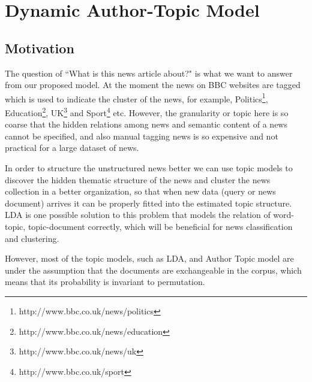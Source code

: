 \chapter{Dynamic Author-Topic Model}
\label{chapterlabel3}

\section{Motivation}

The question of ``What is this news article about?" is what we want to answer from our proposed model. At the moment the news on BBC websites are tagged which is used to indicate the cluster of the news, for example, Politics\footnote{http://www.bbc.co.uk/news/politics}, Education\footnote{http://www.bbc.co.uk/news/education}, UK\footnote{http://www.bbc.co.uk/news/uk} and Sport\footnote{http://www.bbc.co.uk/sport} etc. However, the granularity or topic here is so coarse that the hidden relations among news and semantic content of a news cannot be specified, and also manual tagging news is so expensive and not practical for a large dataset of news. 

In order to structure the unstructured news better we can use topic models to discover the hidden thematic structure of the news and cluster the news collection in a better organization, so that when new data (query or news document) arrives it can be properly fitted into the estimated topic structure. LDA is one possible solution to this problem that models the relation of word-topic, topic-document correctly, which will be beneficial for news classification and clustering. 

However, most of the topic models, such as LDA, and Author Topic model are under the assumption that the documents are exchangeable in the corpus, which means that its probability is invariant to permutation. 

